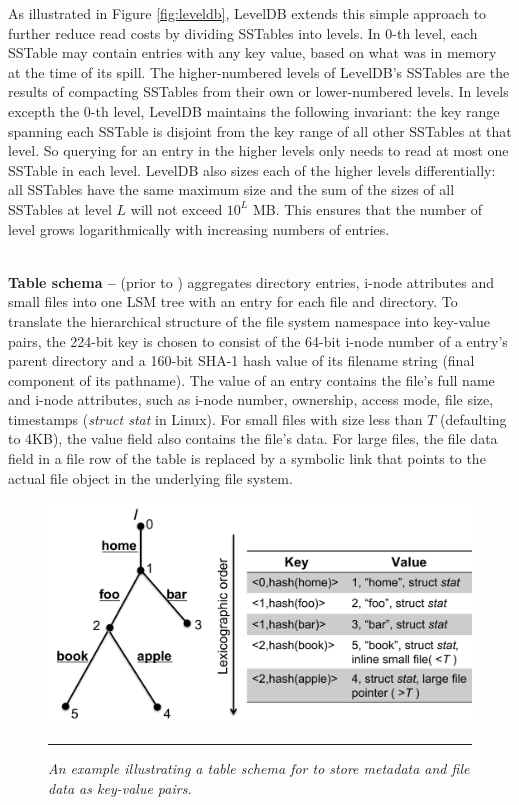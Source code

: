 As illustrated in Figure \ref{fig:leveldb},
LevelDB extends this simple approach to further
reduce read costs by dividing SSTables into levels.
In 0-th level, each SSTable may contain entries with any key value,
based on what was in memory at the time of its spill.
The higher-numbered levels of LevelDB's SSTables are
the results of compacting SSTables from their own or lower-numbered levels.
In levels excepth the 0-th level, LevelDB maintains the following invariant:
the key range spanning each SSTable is disjoint from
the key range of all other SSTables at that level.
So querying for an entry in the higher levels
only needs to read at most one SSTable in each level.
LevelDB also sizes each of the higher levels differentially:
all SSTables have the same maximum size and
the sum of the sizes of all SSTables at level $L$ will not exceed $10^L$ MB.
This ensures that the number of level grows
logarithmically with increasing numbers of entries.

~\\
\textbf{Table schema -- }
\tfs (prior to \sys) aggregates directory entries,
i-node attributes and small files into one LSM tree
with an entry for each file and directory.
To translate the hierarchical structure of the file system namespace
into key-value pairs, the 224-bit key is chosen to consist of
the 64-bit i-node number of a entry's parent directory
and a 160-bit SHA-1 hash value of its filename string
(final component of its pathname).
The value of an entry contains the file's full name and i-node attributes,
such as i-node number, ownership, access mode, file size, timestamps (\textit{struct stat} in Linux).
For small files with size less than $T$ (defaulting to 4KB),
the value field also contains the file's data.
For large files, the file data field in a file row of the table
is replaced by a symbolic link that points to
the actual file object in the underlying file system.

\begin{figure}[t]
\centering
\includegraphics[scale=0.4]{figs/schema}
\vspace{10pt}
\caption{\textit{
An example illustrating a table schema for \tfs
to store metadata and file data as key-value pairs.}}
\hrule
\label{fig:schema}
\end{figure}

